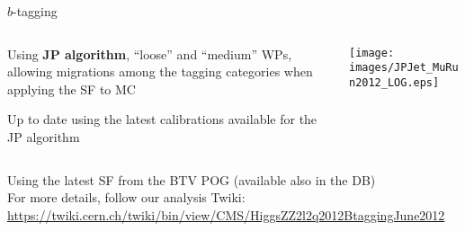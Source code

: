 \documentclass{beamer}
\begin{document}
\begin{frame}{$b$-tagging}
  \begin{columns}
    \begin{column}{0.4\textwidth}
      \begin{itemize}
        {\small
        \item Using {\bf JP algorithm}, ``loose'' and ``medium'' WPs, allowing migrations among the tagging categories when applying the SF to MC
        \item Up to date using the latest calibrations available for the JP algorithm
        }
      \end{itemize}
      
    \end{column}
    
    \begin{column}{0.6\textwidth}
      \texttt{[image: images/JPJet\_MuRun2012\_LOG.eps]}
    \end{column}
  \end{columns}
  
  \vspace{0.2cm}
  \begin{center}
  \footnotesize
  Using the latest SF from the BTV POG (available also in the DB)
  \vspace{2em}
  \\
  For more details, follow our analysis Twiki:
  \\ \tiny
  {\color{blue} \url{https://twiki.cern.ch/twiki/bin/view/CMS/HiggsZZ2l2q2012BtaggingJune2012}}

  
  \end{center}
\end{frame}
\end{document}
